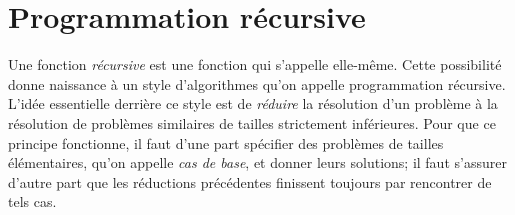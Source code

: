 \documentclass{magnolia}
\begin{document}











\section{Programmation récursive}

Une fonction \emph{récursive} est une fonction qui s'appelle elle-même. Cette
possibilité donne naissance à un style d'algorithmes qu'on appelle programmation
récursive. L'idée essentielle derrière ce style est de \emph{réduire} la résolution
d'un problème à la résolution de problèmes similaires de tailles strictement inférieures.
Pour que ce principe fonctionne, il faut d'une part spécifier des problèmes de tailles
élémentaires, qu'on appelle \emph{cas de base}, et donner leurs solutions; il faut s'assurer
d'autre part que les réductions précédentes finissent toujours par rencontrer de
tels cas.
\end{document}

